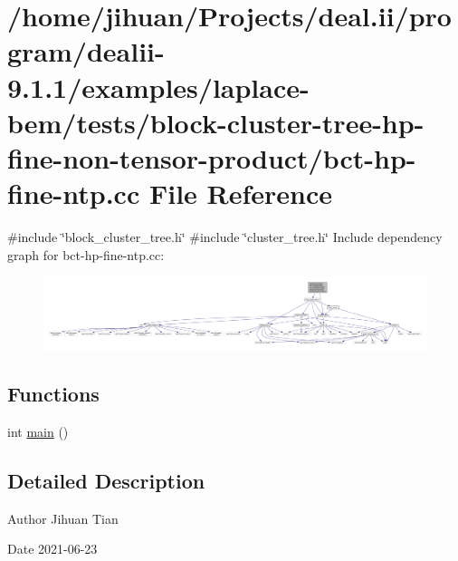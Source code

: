 \hypertarget{bct-hp-fine-ntp_8cc}{}\section{/home/jihuan/\+Projects/deal.ii/program/dealii-\/9.1.1/examples/laplace-\/bem/tests/block-\/cluster-\/tree-\/hp-\/fine-\/non-\/tensor-\/product/bct-\/hp-\/fine-\/ntp.cc File Reference}
\label{bct-hp-fine-ntp_8cc}
{\ttfamily \#include \char`\"{}block\+\_\+cluster\+\_\+tree.\+h\char`\"{}}\newline
{\ttfamily \#include \char`\"{}cluster\+\_\+tree.\+h\char`\"{}}\newline
Include dependency graph for bct-\/hp-\/fine-\/ntp.cc\+:\nopagebreak
\begin{figure}[H]
\begin{center}
\leavevmode
\includegraphics[width=350pt]{bct-hp-fine-ntp_8cc__incl}
\end{center}
\end{figure}
\subsection*{Functions}
\begin{DoxyCompactItemize}
\item 
int \hyperlink{bct-hp-fine-ntp_8cc_ae66f6b31b5ad750f1fe042a706a4e3d4}{main} ()
\end{DoxyCompactItemize}


\subsection{Detailed Description}
\begin{DoxyAuthor}{Author}
Jihuan Tian 
\end{DoxyAuthor}
\begin{DoxyDate}{Date}
2021-\/06-\/23 
\end{DoxyDate}


